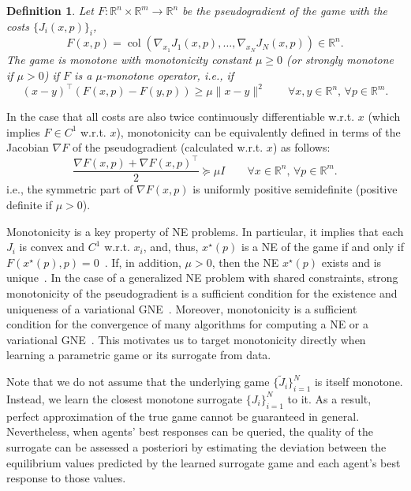 \documentclass[11pt, a4paper]{article}
\newcommand{\rr}{\mathbb{R}}
\newtheorem{definition}[theorem]{Definition}
\theoremstyle{remark}
\theoremstyle{plain}
\begin{document}
\begin{definition}
Let $F:\rr^n\times\rr^m\to\rr^n$ be the pseudogradient of the game with the costs $\{J_i(x,p)\}_i$,
\[
F(x,p)=\operatorname{col}(\nabla_{x_1}J_1(x,p),\ldots,\nabla_{x_N}J_N(x,p))\in\rr^n.
\]
The game is {\it monotone} with monotonicity constant $\mu\geq0$ (or {\it strongly monotone} if $\mu>0$) if $F$ is a $\mu$-monotone operator, i.e., if
\begin{equation}
 (x-y)^\top(F(x,p)-F(y,p))\geq\mu\|x-y\|^2
\qquad\forall x,y\in\rr^n, \, \forall p\in\rr^m.
\label{eq:monotonicity}
\end{equation}
\label{def:monmotone_game}  
\end{definition}
\noindent In the case that all costs are also twice continuously differentiable w.r.t. $x$ (which implies $F\in C^1$ w.r.t. $x$), monotonicity can be equivalently defined in terms of the Jacobian $\nabla F$ of the pseudogradient (calculated w.r.t. $x$)
as follows:
\begin{equation}
\frac{\nabla F(x,p)+\nabla F(x,p)^\top}{2}\succeq\mu I
\qquad\forall x\in\rr^n, \, \forall p\in\rr^m.
\label{eq:monotone-jacobian}
\end{equation}
i.e., the symmetric part of $\nabla F(x,p)$ is uniformly positive semidefinite (positive definite if $\mu>0$).

\noindent Monotonicity is a key property of NE problems. In particular, it implies that each $J_i$ is convex and $C^1$ w.r.t. $x_i$, and, thus, $x^\star(p)$ is a NE of the game if and only if $F(x^\star(p),p)=0$~\cite[Prop. 1.4.2]{FP03}.
If, in addition, $\mu>0$, then the NE $x^\star(p)$ exists and is unique~\cite[Th. 2.3.3(b)]{FP03}. In the case of a generalized NE problem with shared constraints, strong monotonicity of the pseudogradient is a sufficient condition for the existence and uniqueness of a variational GNE~\cite[Th. 12.1.3]{facchinei2010generalized}.
Moreover, monotonicity is a sufficient condition for the convergence of many algorithms for computing a NE or a variational GNE~\cite[Chapter 12]{FP03}. This motivates us to target monotonicity directly when learning a parametric game or its surrogate from data.

Note that we do not assume that the underlying game $\{\tilde J_i\}_{i=1}^N$ is itself monotone. Instead, we learn the closest monotone surrogate $\{J_i\}_{i=1}^N$ to it. As a result, perfect approximation of the true game cannot be guaranteed in general. Nevertheless, 
when agents' best responses can be queried, the quality of the surrogate can be assessed a posteriori by estimating the deviation between the equilibrium values predicted by the learned surrogate game and each agent's best response to those values.
\end{document}
